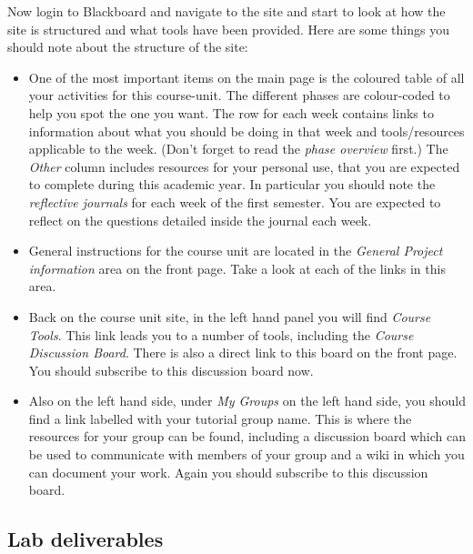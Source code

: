 \begin{firstonly}
Now login to Blackboard and navigate to the  site and start to look at how the site is structured and what tools have been provided.
Here are some things you should note about the structure of the site:


\begin{itemize}

\item One of the most important items on the main page is the coloured
table of all your activities for this course-unit. The different
phases are colour-coded to help you spot the one you want. The row for
each week contains links to information about what you should be doing
in that week and tools/resources applicable to the week. (Don't forget
to read the \emph{phase overview} first.) The \emph{Other} column
includes resources for your personal use, that you are expected to
complete during this academic year. In particular you should note the
\emph{reflective journals} for each week of the first semester. You
are expected to reflect on the questions detailed inside the journal
each week.

\item General instructions for the course unit are located in the
\emph{General Project information} area on the front page. Take a look
at each of the links in this area.  

\item Back on the course unit site, in the left hand panel you will
find \emph{Course Tools}. This link leads you to a number of tools,
including the \emph{Course Discussion Board}. There is also a direct
link to this board on the front page. You should subscribe to this
discussion board now.

\item Also on the left hand side, under \emph{My Groups} on the left
hand side, you should find a link labelled with your tutorial group
name. This is where the resources for your group can be found, including
a discussion board which can be used to communicate with
members of your group and a wiki in which you can document your
work. Again you should subscribe to this discussion board.

\end{itemize}

\subsection{Lab deliverables}
\label{sec:lab-deliverables}


\end{firstonly}
